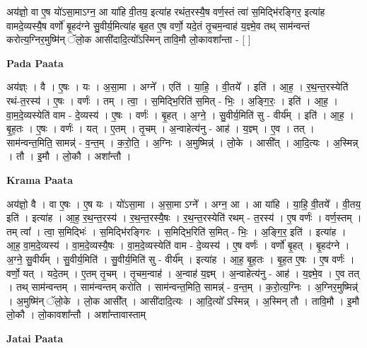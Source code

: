 \documentclass[17pt]{extarticle}
\begin{document}
अय॑ज्ञो॒ वा ए॒ष यो॑ऽसा॒माऽग्न॒ आ या॑हि वी॒तय॒ इत्या॑ह रथंत॒रस्यै॒ष वर्ण॒स्तं त्वा॑ स॒मिद्भि॑रङ्गिर॒ इत्या॑ह वामदे॒व्यस्यै॒ष वर्णो॑ बृ॒हद॑ग्ने सु॒वीर्य॒मित्या॑ह बृह॒त ए॒ष वर्णो॒ यदे॒तं तृ॒चम॒न्वाह॑ य॒ज्ञ्मे॒व तथ् साम॑न्वन्तं करोत्य॒ग्निर॒मुष्मि॑न् ॅलो॒क आसी॑दादि॒त्यो᳚ऽस्मिन् तावि॒मौ लो॒कावशा᳚न्ता - [  ] \newline

\textbf{Pada Paata} \newline

अय॑ज्ञ्ः । वै । ए॒षः । यः । अ॒सा॒मा । अग्ने᳚ । एति॑ । या॒हि॒ । वी॒तये᳚ । इति॑ । आ॒ह॒ । र॒थ॒न्त॒रस्येति॑ रथं-त॒रस्य॑ । ए॒षः । वर्णः॑ । तम् । त्वा॒ । स॒मिद्भि॒रिति॑ स॒मित् - भिः॒ । अ॒ङ्गि॒रः॒ । इति॑ । आ॒ह॒ । वा॒म॒दे॒व्यस्येति॑ वाम - दे॒व्यस्य॑ । ए॒षः । वर्णः॑ । बृ॒हत् । अ॒ग्ने॒ । सु॒वीर्य॒मिति॑ सु - वीर्य᳚म् । इति॑ । आ॒ह॒ । बृ॒ह॒तः । ए॒षः । वर्णः॑ । यत् । ए॒तम् । तृ॒चम् । अ॒न्वाहेत्य॑नु - आह॑ । य॒ज्ञ्म् । ए॒व । तत् । साम॑न्वन्त॒मिति॒ सामन्न्॑ - व॒न्त॒म् । क॒रो॒ति॒ । अ॒ग्निः । अ॒मुष्मिन्न्॑ । लो॒के । आसी᳚त् । आ॒दि॒त्यः । अ॒स्मिन्न् । तौ । इ॒मौ । लो॒कौ । अशा᳚न्तौ ।  \newline


\textbf{Krama Paata} \newline

अय॑ज्ञो॒ वै । वा ए॒षः । ए॒ष यः । यो॑ऽसा॒मा । अ॒सा॒मा ऽग्ने᳚ । अग्न॒ आ । आ या॑हि । या॒हि॒ वी॒तये᳚ । वी॒तय॒ इति॑ । इत्या॑ह । आ॒ह॒ र॒थ॒न्त॒रस्य॑ । र॒थ॒न्त॒रस्यै॒षः । र॒थ॒न्त॒रस्येति॑ रथम् - त॒रस्य॑ । ए॒ष वर्णः॑ । वर्ण॒स्तम् । तम् त्वा᳚ । त्वा॒ स॒मिद्भिः॑ । स॒मिद्भि॑रङ्गिरः । स॒मिद्भि॒रिति॑ स॒मित् - भिः॒ । अ॒ङ्गि॒र॒ इति॑ । इत्या॑ह । आ॒ह॒ वा॒म॒दे॒व्यस्य॑ । वा॒म॒दे॒व्यस्यै॒षः । वा॒म॒दे॒व्यस्येति॑ वाम - दे॒व्यस्य॑ । ए॒ष वर्णः॑ । वर्णो॑ बृ॒हत् । बृ॒हद॑ग्ने । अ॒ग्ने॒ सु॒वीर्य᳚म् । सु॒वीर्य॒मिति॑ । सु॒वीर्य॒मिति॑ सु - वीर्य᳚म् । इत्या॑ह । आ॒ह॒ बृ॒ह॒तः । बृ॒ह॒त ए॒षः । ए॒ष वर्णः॑ । वर्णो॒ यत् । यदे॒तम् । ए॒तम् तृ॒चम् । तृ॒चम॒न्वाह॑ । अ॒न्वाह॑ य॒ज्ञ्म् । अ॒न्वाहेत्य॑नु - आह॑ । य॒ज्ञ्मे॒व । ए॒व तत् । तथ् साम॑न्वन्तम् । साम॑न्वन्तम् करोति । साम॑न्वन्त॒मिति॒ सामन्न्॑ - व॒न्त॒म् । क॒रो॒त्य॒ग्निः । अ॒ग्निर॒मुष्मिन्न्॑ । अ॒मुष्मि॑न् ॅलो॒के । लो॒क आसी᳚त् । आसी॑दादि॒त्यः । आ॒दि॒त्यो᳚ ऽस्मिन्न् । अ॒स्मिन् तौ । तावि॒मौ । इ॒मौ लो॒कौ । लो॒कावशा᳚न्तौ । अशा᳚न्तावास्ताम् \newline

\textbf{Jatai Paata} \newline
\end{document}
